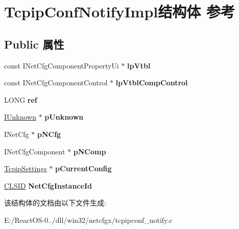\hypertarget{struct_tcpip_conf_notify_impl}{}\section{Tcpip\+Conf\+Notify\+Impl结构体 参考}
\label{struct_tcpip_conf_notify_impl}
\subsection*{Public 属性}
\begin{DoxyCompactItemize}
\item 
\mbox{\label{struct_tcpip_conf_notify_impl_a80f23531d3cc6430871d4d4f81765e4a}} 
const I\+Net\+Cfg\+Component\+Property\+Ui $\ast$ {\bfseries lp\+Vtbl}
\item 
\mbox{\label{struct_tcpip_conf_notify_impl_a54cfc96c0f43f41a7907b3907560db7d}} 
const I\+Net\+Cfg\+Component\+Control $\ast$ {\bfseries lp\+Vtbl\+Comp\+Control}
\item 
\mbox{\label{struct_tcpip_conf_notify_impl_a40803e77fc9e34127f8394dd8bf87eb7}} 
L\+O\+NG {\bfseries ref}
\item 
\mbox{\label{struct_tcpip_conf_notify_impl_a1983edd174b3992749367961fba05a1a}} 
\hyperlink{interface_i_unknown}{I\+Unknown} $\ast$ {\bfseries p\+Unknown}
\item 
\mbox{\label{struct_tcpip_conf_notify_impl_ae2f1a4b73cb22bac7669f19cfb58884a}} 
I\+Net\+Cfg $\ast$ {\bfseries p\+N\+Cfg}
\item 
\mbox{\label{struct_tcpip_conf_notify_impl_a32755a158233c3404cda3b9633cf9a81}} 
I\+Net\+Cfg\+Component $\ast$ {\bfseries p\+N\+Comp}
\item 
\mbox{\label{struct_tcpip_conf_notify_impl_ac13d9f96a5fe923cebc17092d102648d}} 
\hyperlink{struct_tcpip_settings}{Tcpip\+Settings} $\ast$ {\bfseries p\+Current\+Config}
\item 
\mbox{\label{struct_tcpip_conf_notify_impl_ab9b284d529cf706cb661aa3d172d123c}} 
\hyperlink{struct___i_i_d}{C\+L\+S\+ID} {\bfseries Net\+Cfg\+Instance\+Id}
\end{DoxyCompactItemize}


该结构体的文档由以下文件生成\+:\begin{DoxyCompactItemize}
\item 
E\+:/\+React\+O\+S-\/0../dll/win32/netcfgx/tcpipconf\+\_\+notify.\+c\end{DoxyCompactItemize}
